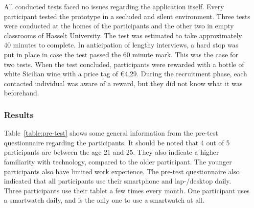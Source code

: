     All conducted tests faced no issues regarding the application itself. Every participant tested the prototype in a secluded and silent environment. Three tests were conducted at the homes of the participants and the other two in empty classrooms of Hasselt University. The test was estimated to take approximately 40 minutes to complete. In anticipation of lengthy interviews, a hard stop was put in place in case the test passed the 60 minute mark. This was the case for two tests. When the test concluded, participants were rewarded with a bottle of white Sicilian wine with a price tag of \euro 4,29. During the recruitment phase, each contacted individual was aware of a reward, but they did not know what it was beforehand. %

        \subsubsection{Results}


        Table~\ref{table:pre-test} shows some general information from the pre-test questionnaire regarding the participants. It should be noted that 4 out of 5 participants are between the age 21 and 25. They also indicate a higher familiarity with technology, compared to the older participant. The younger participants also have limited work experience. The pre-test questionnaire also indicated that all participants use their smartphone and lap-/desktop daily. Three participants use their tablet a few times every month. One participant uses a smartwatch daily, and is the only one to use a smartwatch at all.
        
